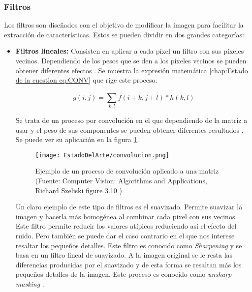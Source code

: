 \subsubsection*{Filtros}
Los filtros son diseñados con el objetivo de modificar la imagen para facilitar la extracción de características. Estos se pueden dividir en dos grandes categorías:

\begin{itemize}
\item \textbf{Filtros lineales:} Consisten en aplicar a cada píxel un filtro con sus píxeles vecinos. Dependiendo de los pesos que se den a los píxeles vecinos se pueden obtener diferentes efectos \cite{convolucion}. Se muestra la expresión matemática \ref{chap:Estado de la cuestion eq:CONV} que rige este proceso.

\begin{equation}\label{chap:Estado de la cuestion eq:CONV}
	g(i,j) =  \sum_{k,l}^{} f(i+k,j+l)*h(k,l)
\end{equation}
	
Se trata de un proceso por convolución en el que dependiendo de la matriz a usar y el peso de sus componentes se pueden obtener diferentes resultados \cite{convolucion}. Se puede ver su aplicación en la figura \ref{chap:Estado de la cuestion fig:CONV}.

\begin{figure}[ht]
	\centering
	\texttt{[image: EstadoDelArte/convolucion.png]}
	\caption[Proceso de convolución en matrices]{Ejemplo de un proceso de convolución aplicado a una matriz (Fuente: Computer Vision: Algorithms and Applications, Richard Szeliski figure 3.10 \cite{szeliski})}
	\label{chap:Estado de la cuestion fig:CONV}
	\vspace{-5pt}
\end{figure}

Un claro ejemplo de este tipo de filtros es el suavizado. Permite suavizar la imagen y hacerla más homogénea al combinar cada pixel con sus vecinos. Este filtro permite reducir los valores atípicos reduciendo así el efecto del ruido. Pero también se puede dar el caso contrario en el que nos interese resaltar los pequeños detalles. Este filtro es conocido como \textit{Sharpening} y se basa en un filtro lineal de suavizado. A la imagen original se le resta las diferencias producidas por el suavizado y de esta forma se resaltan más los pequeños detalles de la imagen. Este proceso es conocido como \textit{unsharp masking} \cite{szeliski}.


\end{itemize}
